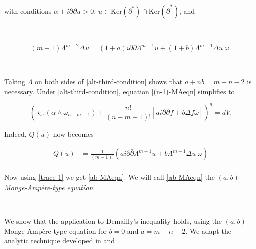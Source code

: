 \documentclass[11pt,letterpaper]{amsart}
\newcommand{\spartial}{\partial^*}
\newcommand{\pbp}{\partial \bar{\partial}}
\newcommand{\Ker}{\mbox{Ker}}
\numberwithin{equation}{section}
\begin{document}
\


\noindent with conditions $\alpha + i\pbp u >0$, $u \in \Ker (\spartial) \cap \Ker( \bar{\partial}^*)$, and 

\

\begin{equation}\label{alt-third-condition}
     (m-1)\Lambda^{m-2} \Delta u = (1+a) i \pbp \Lambda^{m-1}  u +  (1+b) \Lambda^{m-1} \Delta u \;\omega.
\end{equation}


\

Taking $\Lambda$ on both sides of \eqref{alt-third-condition} shows that $a+nb = m-n-2$ is necessary. Under \eqref{alt-third-condition}, equation \eqref{(n-1)-MAeqn} simplifies to 

\begin{equation}\label{ab-MAeqn}
    \left(\star_{\omega}(\alpha \wedge \omega_{n-m-1}) + \frac{n!}{(n-m+1)!} \left[ a i\pbp f + b \Delta f \omega\right] \right)^n = dV.
    \end{equation}

Indeed, $Q(u)$ now becomes

\begin{equation}
    \begin{aligned}
        Q(u) &= \frac{1}{(m-1)!}\left(a  i \pbp \Lambda^{m-1}  u +  b \Lambda^{m-1} \Delta u \;\omega\right)\\
    \end{aligned}
\end{equation}

 Now using \eqref{trace-1} we get \eqref{ab-MAeqn}. We will call \eqref{ab-MAeqn} the {\em $(a,b)$ Monge-Amp\`ere-type equation}.

\

We show that the application to Demailly's inequality holds, using the $(a,b)$ Monge-Amp\`ere-type equation for $b=0$ and $a= m-n-2$. We adapt the analytic technique developed in \cite{DP25} and \cite{Popovici16}.
\end{document}
